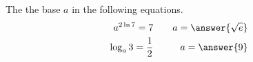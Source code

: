 \documentclass{ximera}
\author{Nela Lakos \and Kyle Parsons}
\begin{document}
\begin{exercise}

The the base $a$ in the following equations.
\begin{align*}
a^{2\ln{7}} = 7 & \quad & a=\answer{\sqrt{e}}\\
\log_a{3} = \frac{1}{2} && a=\answer{9}
\end{align*}

\end{exercise}
\end{document}
